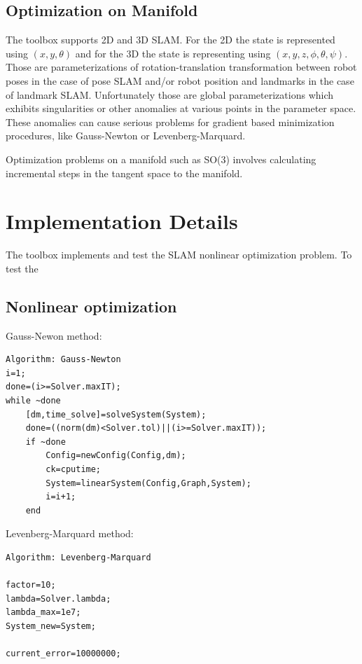 \documentclass{article}
\begin{document}
{\subsection{Optimization on Manifold}\label{subsec:manifold}
The toolbox supports 2D and 3D SLAM. For the 2D the state is represented using $(x,y,\theta)$ and for the 3D the state is representing using $(x,y,z,\phi,\theta,\psi)$. Those are parameterizations of rotation-translation transformation between robot poses in the case of pose SLAM and/or robot position and landmarks in the case of landmark SLAM. Unfortunately those are global parameterizations  which exhibits singularities or other anomalies at various points in the parameter
space. These anomalies can cause serious problems for gradient based minimization procedures, like Gauss-Newton or Levenberg-Marquard.

Optimization problems on a manifold such as SO(3) involves calculating incremental steps in the tangent space to the manifold.

\section{Implementation Details}\label{subsec:Impl}
The toolbox implements and test the SLAM nonlinear optimization problem. To test the 
\subsection{Nonlinear optimization}
Gauss-Newon method:
\begin{Verbatim}[frame=single]
Algorithm: Gauss-Newton
i=1;
done=(i>=Solver.maxIT);
while ~done
    [dm,time_solve]=solveSystem(System); 
    done=((norm(dm)<Solver.tol)||(i>=Solver.maxIT));
    if ~done     
        Config=newConfig(Config,dm);
        ck=cputime;
        System=linearSystem(Config,Graph,System);
        i=i+1;     
    end
\end{Verbatim}    
Levenberg-Marquard method:
\begin{Verbatim}[frame=single]
Algorithm: Levenberg-Marquard

factor=10;
lambda=Solver.lambda;
lambda_max=1e7;
System_new=System;

current_error=10000000;


\end{Verbatim}}
\end{document}
